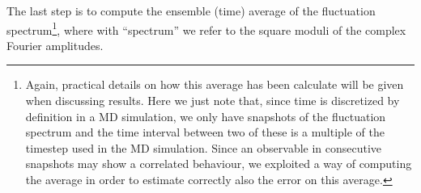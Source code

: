 The last step is to compute the ensemble (time) average of the fluctuation spectrum\footnote{Again, practical details on how this average has been calculate will be given when discussing results. Here we just note that, since time is discretized by definition in a MD simulation, we only have snapshots of the fluctuation spectrum and the time interval between two of these is a multiple of the timestep used in the MD simulation. Since an observable in consecutive snapshots may show a correlated behaviour, we exploited a way of computing the average in order to estimate correctly also the error on this average.}, where with ``spectrum'' we refer to the square moduli of the complex Fourier amplitudes. %

%

